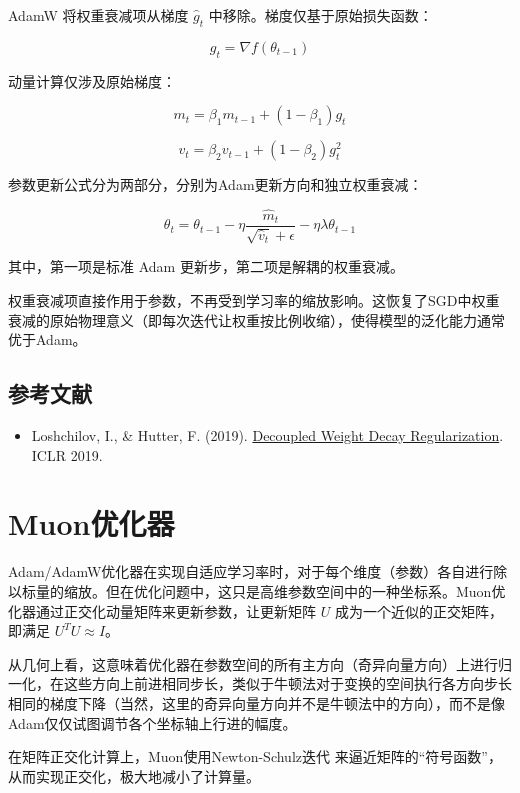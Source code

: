 AdamW 将权重衰减项从梯度 \(\hat{g}_t\) 中移除。梯度仅基于原始损失函数：

\[
g_t = \nabla f(\theta_{t-1})
\]

动量计算仅涉及原始梯度：

\[
m_t = \beta_1m_{t-1} + (1-\beta_1)g_t
\]

\[
v_t = \beta_2v_{t-1} + (1-\beta_2)g_t^2
\]

参数更新公式分为两部分，分别为Adam更新方向和独立权重衰减：

\[
\theta_t = \theta_{t-1} - \eta\frac{\hat{m}_t}{\sqrt{\hat{v}_t}+\epsilon} - \eta\lambda\theta_{t-1}
\]

其中，第一项是标准 Adam 更新步，第二项是解耦的权重衰减。

权重衰减项直接作用于参数，不再受到学习率的缩放影响。这恢复了SGD中权重衰减的原始物理意义（即每次迭代让权重按比例收缩），使得模型的泛化能力通常优于Adam。

\hypertarget{ux53c2ux8003ux6587ux732e-29}{%
\subsection{参考文献}\label{ux53c2ux8003ux6587ux732e-29}}

\vspace{0.25em}
\begin{itemize}
\tightlist
\item
  Loshchilov, I., \& Hutter, F. (2019). \href{https://arxiv.org/abs/1711.05101}{Decoupled Weight Decay Regularization}. ICLR 2019.
\end{itemize}

\clearpage

\hypertarget{muonux4f18ux5316ux5668}{%
\section{Muon优化器}\label{muonux4f18ux5316ux5668}}

Adam/AdamW优化器在实现自适应学习率时，对于每个维度（参数）各自进行除以标量的缩放。但在优化问题中，这只是高维参数空间中的一种坐标系。Muon优化器通过正交化动量矩阵来更新参数，让更新矩阵 \(U\) 成为一个近似的正交矩阵，即满足 \(U^{T}U\approx I\)。

从几何上看，这意味着优化器在参数空间的所有主方向（奇异向量方向）上进行归一化，在这些方向上前进相同步长，类似于牛顿法对于变换的空间执行各方向步长相同的梯度下降（当然，这里的奇异向量方向并不是牛顿法中的方向），而不是像Adam仅仅试图调节各个坐标轴上行进的幅度。

在矩阵正交化计算上，Muon使用Newton-Schulz迭代 来逼近矩阵的``符号函数''，从而实现正交化，极大地减小了计算量。

